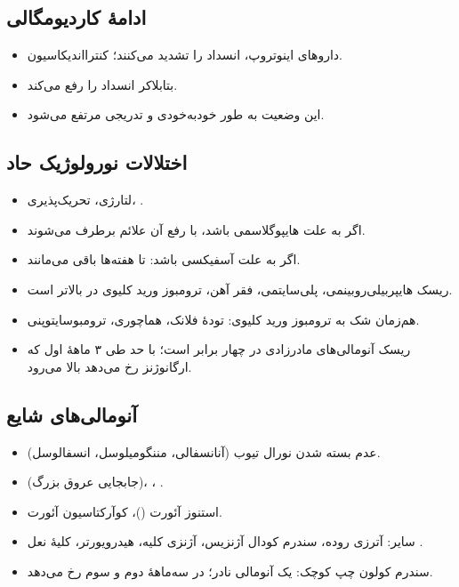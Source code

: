 \documentclass[12pt,a4paper]{article}
\begin{document}
\clearpage
{}
\subsection*{ادامهٔ کاردیومگالی}
\begin{itemize}
\item داروهای اینوتروپ، انسداد را تشدید می‌کنند؛ کنترااندیکاسیون.
\item بتابلاکر انسداد را رفع می‌کند.
\item این وضعیت به طور خودبه‌خودی و تدریجی مرتفع می‌شود.
\end{itemize}
\subsection*{اختلالات نورولوژیک حاد}
\begin{itemize}
\item لتارژی، تحریک‌پذیری، .
\item اگر به علت هایپوگلاسمی باشد، با رفع آن علائم برطرف می‌شوند.
\item اگر به علت آسفیکسی باشد: تا هفته‌ها باقی می‌مانند.
\end{itemize}
\begin{itemize}
\item ریسک هایپربیلی‌روبینمی، پلی‌سایتمی، فقر آهن، ترومبوز ورید کلیوی در  بالاتر است.
\item هم‌زمان شک به ترومبوز ورید کلیوی: تودهٔ فلانک، هماچوری، ترومبوسایتوپنی.
\item ریسک آنومالی‌های مادرزادی در  چهار برابر است؛ با حد  طی ۳ ماههٔ اول که ارگانوژنز رخ می‌دهد بالا می‌رود.
\end{itemize}
\subsection*{آنومالی‌های شایع}
\begin{itemize}
\item عدم بسته شدن نورال تیوب (آنانسفالی، مننگومیلوسل، انسفالوسل).
\item {} (جابجایی عروق بزرگ)، ، .
\item استنوز آئورت ()، کوآرکتاسیون آئورت.
\item سایر: آترزی روده، سندرم کودال آژنزیس، آژنزی کلیه، هیدرویورتر، کلیهٔ نعل .
\end{itemize}

\clearpage
{}
\begin{itemize}
\item سندرم کولون چپ کوچک: یک آنومالی نادر؛ در سه‌ماههٔ دوم و سوم رخ می‌دهد.
\end{itemize}
\end{document}
